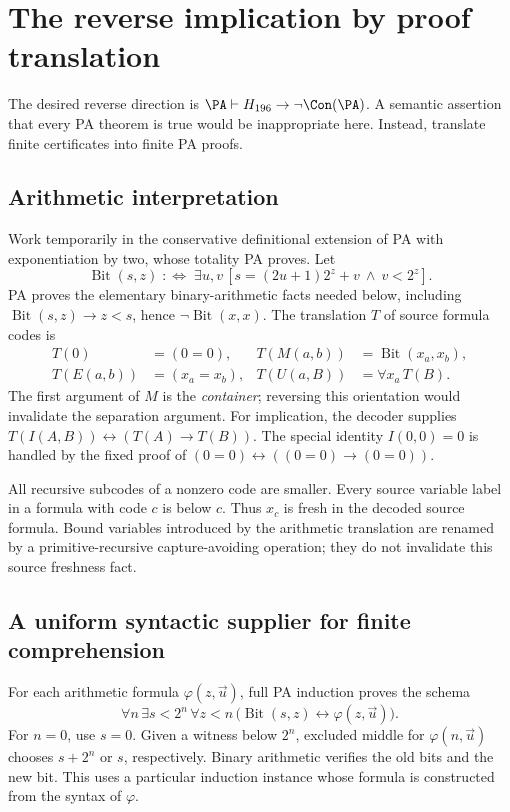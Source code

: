 \section{The reverse implication by proof translation}\label{sec:internal}
The desired reverse direction is \(\PA\vdash H_{196}\to\neg\Con(\PA)\). A semantic assertion that every PA theorem is true would be inappropriate here. Instead, translate finite certificates into finite PA proofs.

\subsection{Arithmetic interpretation}
Work temporarily in the conservative definitional extension of PA with exponentiation by two, whose totality PA proves. Let
\[
 \operatorname{Bit}(s,z)\;:\!\iff\;
 \exists u,v\,[s=(2u+1)2^z+v\ \wedge\ v<2^z].
\]
PA proves the elementary binary-arithmetic facts needed below, including
\(\operatorname{Bit}(s,z)\to z<s\), hence \(\neg\operatorname{Bit}(x,x)\).
The translation \(T\) of source formula codes is
\[
\begin{aligned}
 T(0)&=(0=0),& T(M(a,b))&=\operatorname{Bit}(x_a,x_b),\\
 T(E(a,b))&=(x_a=x_b),& T(U(a,B))&=\forall x_a\,T(B).
\end{aligned}
\]
The first argument of \(M\) is the \emph{container}; reversing this orientation would invalidate the separation argument. For implication, the decoder supplies \(T(I(A,B))\leftrightarrow(T(A)\to T(B))\). The special identity \(I(0,0)=0\) is handled by the fixed proof of \((0=0)\leftrightarrow((0=0)\to(0=0))\).

All recursive subcodes of a nonzero code are smaller. Every source variable label in a formula with code \(c\) is below \(c\). Thus \(x_c\) is fresh in the decoded source formula. Bound variables introduced by the arithmetic translation are renamed by a primitive-recursive capture-avoiding operation; they do not invalidate this source freshness fact.

\subsection{A uniform syntactic supplier for finite comprehension}
For each arithmetic formula \(\varphi(z,\vec u)\), full PA induction proves the schema
\begin{equation}\label{eq:comprehension}
 \forall n\,\exists s<2^n\,\forall z<n\,
 \bigl(\operatorname{Bit}(s,z)\leftrightarrow\varphi(z,\vec u)\bigr).
\end{equation}
For \(n=0\), use \(s=0\). Given a witness below \(2^n\), excluded middle for \(\varphi(n,\vec u)\) chooses \(s+2^n\) or \(s\), respectively. Binary arithmetic verifies the old bits and the new bit. This uses a particular induction instance whose formula is constructed from the syntax of \(\varphi\).

